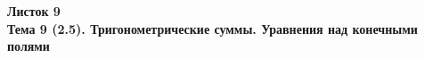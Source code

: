 \documentclass[a4paper, 11pt]{article}
\begin{document}
\begin{center} \Large \bf Листок 9\\ Тема 9 (2.5). Тригонометрические суммы. Уравнения над конечными полями \end{center}


\end{document}
